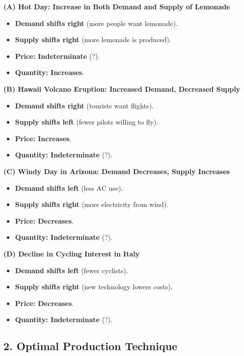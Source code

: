 \documentclass{article}
\begin{document}
\textbf{(A) Hot Day: Increase in Both Demand and Supply of Lemonade}
\begin{itemize}
    \item \textbf{Demand shifts right} (more people want lemonade).
    \item \textbf{Supply shifts right} (more lemonade is produced).
    \item \textbf{Price: Indeterminate} (?).
    \item \textbf{Quantity: Increases}.
\end{itemize}

\textbf{(B) Hawaii Volcano Eruption: Increased Demand, Decreased Supply}
\begin{itemize}
    \item \textbf{Demand shifts right} (tourists want flights).
    \item \textbf{Supply shifts left} (fewer pilots willing to fly).
    \item \textbf{Price: Increases}.
    \item \textbf{Quantity: Indeterminate} (?).
\end{itemize}

\textbf{(C) Windy Day in Arizona: Demand Decreases, Supply Increases}
\begin{itemize}
    \item \textbf{Demand shifts left} (less AC use).
    \item \textbf{Supply shifts right} (more electricity from wind).
    \item \textbf{Price: Decreases}.
    \item \textbf{Quantity: Indeterminate} (?).
\end{itemize}

\textbf{(D) Decline in Cycling Interest in Italy}
\begin{itemize}
    \item \textbf{Demand shifts left} (fewer cyclists).
    \item \textbf{Supply shifts right} (new technology lowers costs).
    \item \textbf{Price: Decreases}.
    \item \textbf{Quantity: Indeterminate} (?).
\end{itemize}

\subsection*{2. Optimal Production Technique}
\end{document}
